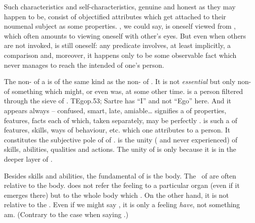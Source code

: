Such characteristics and self-characteristics, genuine and honest as they may
happen to be, consist of {objectified} attributes which get attached to their
noumenal subject as some  properties. , we could say, is
oneself viewed from , which often amounts to viewing oneself with
other's eyes. But even when others are not invoked,  is still
 oneself: any predicate involves, at least implicitly, a comparison
and, moreover, it happens only to be some  observable fact which
never manages to reach the intended  of one's person.

The non- of a  is of the same kind as the
non- of . It is not {\em essential}  but
only non- of something which might, or even was,  at
some other time.   is a person filtered through the 
sieve of .  \citet{The Ego never appears except on the occasion
  of a reflective act.}{TEgo}{p.53; Sartre has ``I'' and not ``Ego'' here.}
And it appears always  -- confused, smart, late, amiable\ldots  {}
signifies a  of properties, features, facts each of which, taken
separately, may be perfectly .   is such a  of
features, skills, ways of behaviour, etc.  which one attributes to a person.  It
constitutes the subjective pole of  of .
  is the  unity ( and
never experienced) of skills, abilities, qualities and actions.  The unity of
 is only  because it is  in the deeper layer of
.


\pa
Besides skills and abilities, the fundamental  of  is the
body. The \oss\ of
 are often relative to the body.  does not refer
the feeling to a particular organ (even if it emerges there) but to the whole
body which . On the other hand, it is not relative to the .
Even if we might say , it is only a feeling  {\em have},
not something  am. (Contrary to the case when saying .)

